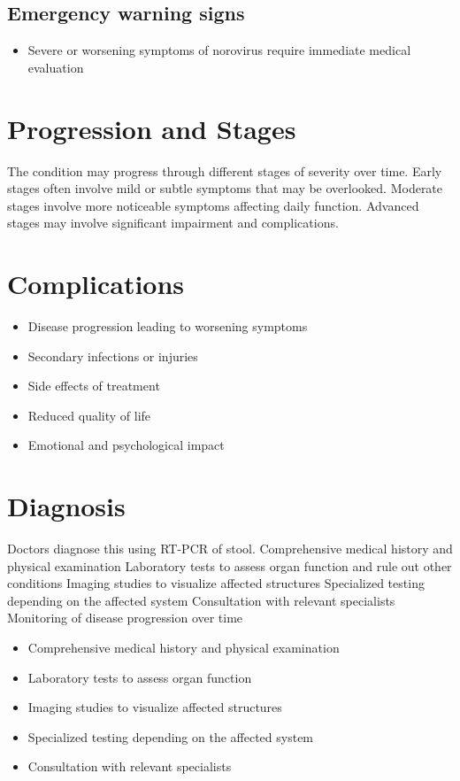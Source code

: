 \subsection{Emergency warning signs}
\begin{itemize}[noitemsep]
  \item Severe or worsening symptoms of norovirus require immediate medical evaluation
\end{itemize}
\section{Progression and Stages}
The condition may progress through different stages of severity over time. Early stages often involve mild or subtle symptoms that may be overlooked. Moderate stages involve more noticeable symptoms affecting daily function. Advanced stages may involve significant impairment and complications.
\section{Complications}
\begin{itemize}[noitemsep]
  \item Disease progression leading to worsening symptoms
  \item Secondary infections or injuries
  \item Side effects of treatment
  \item Reduced quality of life
  \item Emotional and psychological impact
\end{itemize}
\section{Diagnosis}
Doctors diagnose this using RT-PCR of stool. Comprehensive medical history and physical examination Laboratory tests to assess organ function and rule out other conditions Imaging studies to visualize affected structures Specialized testing depending on the affected system Consultation with relevant specialists Monitoring of disease progression over time

\begin{itemize}[noitemsep]
  \item Comprehensive medical history and physical examination
  \item Laboratory tests to assess organ function
  \item Imaging studies to visualize affected structures
  \item Specialized testing depending on the affected system
  \item Consultation with relevant specialists
\end{itemize}

